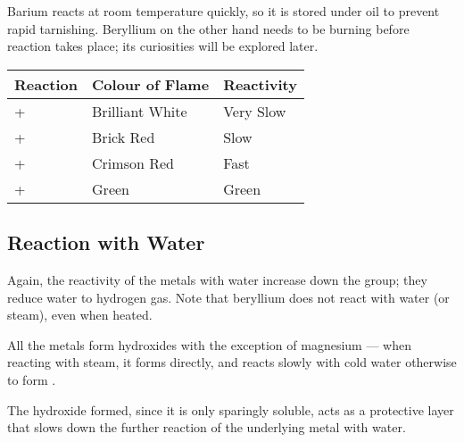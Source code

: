 			Barium reacts at room temperature quickly, so it is stored under oil to prevent rapid tarnishing. Beryllium on the other hand needs
			to be burning before  reaction takes place; its curiosities will be explored later.


			\begin{center}\begin{table}[htb]\renewcommand{\arraystretch}{1.5}
			\begin{tabu} to \textwidth {X[-4,c,m] | X[c,m] | X[c,m]}

				Reaction									&	Colour of Flame		&	Reactivity	\\	\hline
				 + 	&	Brilliant White		& 	Very Slow	\\	\hline
				 + 	&	Brick Red			& 	Slow		\\	\hline
				 + 	&	Crimson Red			& 	Fast		\\	\hline
				 + 	&	Green				& 	Green		\\	\hline

			\end{tabu}
			\end{table}\end{center}\vspace{-10mm}



		\pagebreak
		\subsection{Reaction with Water}

			Again, the reactivity of the metals with water increase down the group; they reduce water to
			hydrogen gas. Note that beryllium does not react with water (or steam), even when heated.

			All the metals form hydroxides with the exception of magnesium --- when reacting with steam,
			it forms  directly, and reacts slowly with cold water otherwise to form .


			The hydroxide formed, since it is only sparingly soluble, acts as a protective layer that slows down the further reaction of
			the underlying metal with water.

